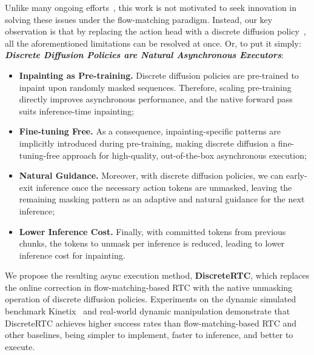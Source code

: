 \documentclass{article}
\begin{document}
Unlike many ongoing efforts~\citep{liu2026learning, lu2026faster, black2025training, yang2026abpolicy}, this work is not motivated to seek innovation in solving these issues under the flow-matching paradigm.
Instead, our key observation is that by replacing the action head with a discrete diffusion policy~\citep{liang2025discrete}, all the aforementioned limitations can be resolved at once. Or, to put it simply: \emph{\textbf{Discrete Diffusion Policies are Natural Asynchronous Executors}}:

\begin{itemize}
    \item [(a)] \textbf{Inpainting as Pre-training.} Discrete diffusion policies are pre-trained to inpaint upon randomly masked sequences. Therefore, scaling pre-training directly improves asynchronous performance, and the native forward pass suits inference-time inpainting;
    \item [(b)] \textbf{Fine-tuning Free.} As a consequence, inpainting-specific patterns are implicitly introduced during pre-training, making discrete diffusion a fine-tuning-free approach for high-quality, out-of-the-box asynchronous execution;
    \item [(c)] \textbf{Natural Guidance.} Moreover, with discrete diffusion policies, we can early-exit inference once the necessary action tokens are unmasked, leaving the remaining masking pattern as an adaptive and natural guidance for the next inference;
    \item [(d)] \textbf{Lower Inference Cost.} Finally, with committed tokens from previous chunks, the tokens to unmask per inference is reduced, leading to lower inference cost for inpainting.
\end{itemize}

We propose the resulting async execution method, \textbf{DiscreteRTC}, which replaces the online correction in flow-matching-based RTC with the native unmasking operation of discrete diffusion policies.
Experiments on the dynamic simulated benchmark Kinetix~\citep{matthews2024kinetix} and real-world dynamic manipulation demonstrate that DiscreteRTC achieves higher success rates than flow-matching-based RTC and other baselines, being simpler to implement, faster to inference, and better to execute.
\end{document}
